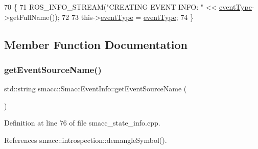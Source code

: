 \begin{DoxyCode}
70 \{
71     ROS\_INFO\_STREAM(\textcolor{stringliteral}{"CREATING EVENT INFO: "} << \hyperlink{structsmacc_1_1introspection_1_1SmaccEventInfo_af3bdf1abf797864e681662d92a5515f9}{eventType}->getFullName());
72 
73     this->\hyperlink{structsmacc_1_1introspection_1_1SmaccEventInfo_af3bdf1abf797864e681662d92a5515f9}{eventType} = \hyperlink{structsmacc_1_1introspection_1_1SmaccEventInfo_af3bdf1abf797864e681662d92a5515f9}{eventType};
74 \}
\end{DoxyCode}


\subsection{Member Function Documentation}
\mbox{\label{structsmacc_1_1introspection_1_1SmaccEventInfo_af9e90a557f8f62069a17234f79bcefa0}} 
\subsubsection{\texorpdfstring{get\+Event\+Source\+Name()}{getEventSourceName()}}
{\footnotesize\ttfamily std\+::string smacc\+::\+Smacc\+Event\+Info\+::get\+Event\+Source\+Name (\begin{DoxyParamCaption}{ }\end{DoxyParamCaption})}



Definition at line 76 of file smacc\+\_\+state\+\_\+info.\+cpp.



References smacc\+::introspection\+::demangle\+Symbol().


